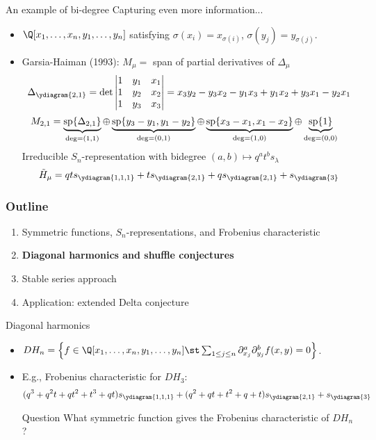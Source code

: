 \documentclass{beamer}
\renewcommand{\Span}{\operatorname{sp}}
\begin{document}
\begin{frame}{An example of bi-degree}
  Capturing even more information...\pause
  \begin{itemize}
  \item \(\Q[x_1,\ldots,x_n,y_1,\ldots,y_n]\) satisfying
    \(\sigma(x_i) = x_{\sigma(i)}\), \(\sigma(y_j) = y_{\sigma(j)}\).\pause
  \item Garsia-Haiman (1993): \(M_\mu = \) span of partial derivatives of
    \(\Delta_\mu\) \pause \[
      \Delta_{\ydiagram{2,1}} = \det \left|
        \begin{matrix}
          1 & y_1 & x_1 \\
          1 & y_2 & x_2 \\
          1 & y_3 & x_3
        \end{matrix}
      \right| = x_3 y_2 - y_3 x_2 - y_1 x_3 + y_1 x_2 + y_3 x_1 - y_2 x_1
    \]
    \pause
  \[
    \hspace{-1em}
      M_{2,1} = \underbrace{\Span\{\Delta_{2,1}\}}_{\deg = (1,1)}
      \oplus \underbrace{\Span\{y_3-y_1, y_1 - y_2\}}_{\deg = (0,1)}
      \oplus \underbrace{\Span\{x_3-x_1, x_1 - x_2\}}_{\deg = (1,0)}
      \oplus \underbrace{\Span \{1\}}_{\deg = (0,0)}
    \]
    \pause
    Irreducible \(S_n\)-representation with bidegree \((a,b) \mapsto
    q^at^b s_\lambda\) \pause \[
      \tilde{H}_\mu = qt s_{\ydiagram{1,1,1}} + t
      s_{\ydiagram{2,1}} + q s_{\ydiagram{2,1}} + s_{\ydiagram{3}}
    \]
  \end{itemize}
\end{frame}
\begin{frame}
  \frametitle{Outline}
  \begin{enumerate}
  \item Symmetric functions, \(S_n\)-representations, and Frobenius characteristic
  \item {\bf Diagonal harmonics and shuffle conjectures}
  \item {Stable series approach}
  \item Application: extended Delta conjecture
  \end{enumerate}
\end{frame}
\begin{frame}{Diagonal harmonics}
  \begin{itemize}
  \item \(DH_n = \left\{ f \in \Q[x_1,\ldots,x_n,y_1,\ldots,y_n] \st
    \sum_{1 \leq j \leq n} \partial_{x_j}^a \partial_{y_j}^b f(x,y) =
    0 \right\}\).\pause
  \item E.g., Frobenius characteristic for \(DH_3\):
  \[
    (q^3+q^2t+qt^2+t^3+qt)s_{\ydiagram{1, 1, 1}} + (q^2+qt+t^2+q+t)s_{\ydiagram{2, 1}} + s_{\ydiagram{3}}
  \]\pause
  \begin{block}{Question}
    What symmetric function gives the Frobenius characteristic of \(DH_n\)?
  \end{block}
    \end{itemize}
\end{frame}
\end{document}
